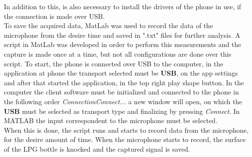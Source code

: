 In addition to this, is also necessary to install the drivers of the phone in use, if the connection is made over USB.\\
To save the acquired data, MatLab was used to record the data of the microphone from the desire time and saved in ".txt" files for further analysis. 
A script in MatLab was developed in order to perform this measurements and the capture is made once at a time, but not all configurations are done over this script. To start, the phone is connected over USB to the computer, in the application at phone the transport selected must be \textbf{USB}, on the app settings and after that started the application, in the top right play shape button. 
In the computer the client software must be initialized and connected to the phone in the following order \textit{\>Connection\>Connect...} a new window will open, on which the \textbf{USB} must be selected as transport type and finalizing by pressing \textit{Connect}. In MATLAB the input correspondent to the microphone must be selected.\\
When this is done, the script runs and starts to record data from the microphone, for the desire amount of time. When the microphone starts to record, the surface of the LPG bottle is knocked and the captured signal is saved.

